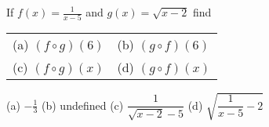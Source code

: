 {If $\displaystyle{f(x)=\frac{1}{x-5}}$ and $g(x)=\sqrt {x-2}$ find
\begin{tabular}{ll}
(a) $(f \circ g)(6)$ & (b) $(g \circ f)(6)$ \\
(c) $(f \circ g)(x)$ & (d) $(g \circ f)(x)$
\end{tabular}}
{(a) $-\frac13$ \qquad (b) undefined \qquad (c) $\dfrac1{\sqrt{x-2}-5}$ \qquad (d) $\sqrt{\dfrac1{x-5}-2}$}
